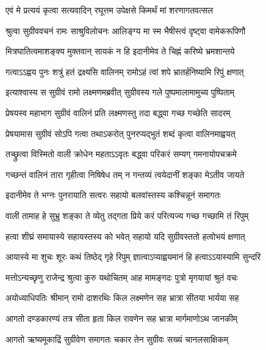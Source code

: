 \twolineshloka
{एवं मे प्रत्ययं कृत्वा सत्यवादिन् रघूत्तम}
{उपेक्षसे किमर्थं मां शरणागतवत्सल} %

\twolineshloka
{श्रुत्वा सुग्रीववचनं रामः साश्रुविलोचनः}
{आलिङ्ग्य मा स्म भैषीस्त्वं दृष्ट्वा वामेकरूपिणौ} %

\twolineshloka
{मित्रघातित्वमाशङ्क्य मुक्तवान् सायकं न हि}
{इदानीमेव ते चिह्नं करिष्ये भ्रमशान्तये} %

\twolineshloka
{गत्वाऽऽह्वय पुनः शत्रुं हतं द्रक्ष्यसि वालिनम्}
{रामोऽहं त्वां शपे भ्रातर्हनिष्यामि रिपुं क्षणात्} %

\twolineshloka
{इत्याश्वास्य स सुग्रीवं रामो लक्ष्मणमब्रवीत्}
{सुग्रीवस्य गले पुष्पमालामामुच्य पुष्पिताम्} %

\twolineshloka
{प्रेषयस्व महाभाग सुग्रीवं वालिनं प्रति}
{लक्ष्मणस्तु तदा बद्\mbox{}ध्वा गच्छ गच्छेति सादरम्} %

\twolineshloka
{प्रेषयामास सुग्रीवं सोऽपि गत्वा तथाऽकरोत्}
{पुनरप्यद्भुतं शब्दं कृत्वा वालिनमाह्वयत्} %

\twolineshloka
{तच्छ्रुत्वा विस्मितो वाली क्रोधेन महताऽऽवृतः}
{बद्\mbox{}ध्वा परिकरं सम्यग् गमनायोपचक्रमे} %

\twolineshloka
{गच्छन्तं वालिनं तारा गृहीत्वा निषिषेध तम्}
{न गन्तव्यं त्वयेदानीं शङ्का मेऽतीव जायते} %

\twolineshloka
{इदानीमेव ते भग्नः पुनरायाति सत्वरः}
{सहायो बलवांस्तस्य कश्चिन्नूनं समागतः} %

\twolineshloka
{वाली तामाह हे सुभ्रु शङ्का ते व्येतु तद्गता}
{प्रिये करं परित्यज्य गच्छ गच्छामि तं रिपुम्} %

\twolineshloka
{हत्वा शीघ्रं समायास्ये सहायस्तस्य को भवेत्}
{सहायो यदि सुग्रीवस्ततो हत्वोभयं क्षणात्} %

\twolineshloka
{आयास्ये मा शुचः शूरः कथं तिष्ठेद् गृहे रिपुम्}
{ज्ञात्वाऽप्याह्वयमानं हि हत्वाऽऽयास्यामि सुन्दरि} %


\twolineshloka
{मत्तोऽन्यच्छृणु राजेन्द्र श्रुत्वा कुरु यथोचितम्}
{आह मामङ्गदः पुत्रो मृगयायां श्रुतं वचः} %

\twolineshloka
{अयोध्याधिपतिः श्रीमान् रामो दाशरथिः किल}
{लक्ष्मणेन सह भ्रात्रा सीतया भार्यया सह} %

\twolineshloka
{आगतो दण्डकारण्यं तत्र सीता हृता किल}
{रावणेन सह भ्रात्रा मार्गमाणोऽथ जानकीम्} %

\twolineshloka
{आगतो ऋष्यमूकाद्रिं सुग्रीवेण समागतः}
{चकार तेन सुग्रीवः सख्यं चानलसाक्षिकम्} %

